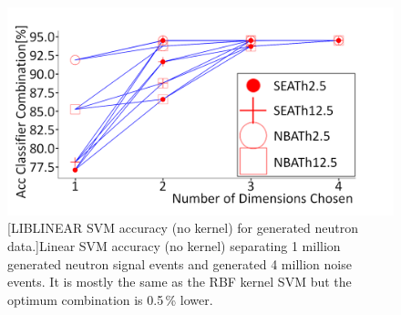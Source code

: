 \begin{figure}[!h]
\centering
\includegraphics[width=0.8\linewidth]{Appendix1/Figs/accLinNeutronSVMC1e6_g1e-6MedText.png}
[LIBLINEAR SVM accuracy (no kernel) for generated neutron data.]{Linear SVM accuracy (no kernel) separating 1 million generated neutron signal events and generated 4 million noise events. It is mostly the same as the RBF kernel SVM but the optimum combination is 0.5\,\% lower.} 
\label{fig:accLinNeutronSVMC1e6_g1e-6MedText}
\end{figure}

